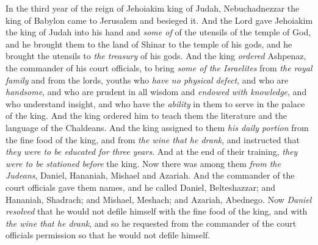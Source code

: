 
\begin{biblechapter} %
 In the third year of the reign of Jehoiakim king of Judah, Nebuchadnezzar the king of Babylon came to Jerusalem and besieged it.
\verse And the Lord gave Jehoiakim the king of Judah into his hand and \textit{some of} of the utensils of the temple of God, and he brought them to the land of Shinar to the temple of his gods, and he brought the utensils to \textit{the treasury} of his gods.
\verse And the king \textit{ordered} Ashpenaz, the commander of his court officials, to bring \textit{some of the Israelites} from \textit{the royal family} and from the lords,
\verse youths who \textit{have no physical defect}, and who are \textit{handsome}, and who are prudent in all wisdom and \textit{endowed with knowledge}, and who understand insight, and who have the \textit{ability} in them to serve in the palace of the king. And the king ordered him to teach them the literature and the language of the Chaldeans.
\verse And the king assigned to them \textit{his daily portion} from the fine food of the king, and from \textit{the wine that he drank}, and instructed that \textit{they were to be educated for three years}. And at the end of their training, \textit{they were to be stationed} \textit{before} the king.
\verse Now there was among them \textit{from the Judeans}, Daniel, Hananiah, Mishael and Azariah.
\verse And the commander of the court officials gave them names, and he called Daniel, Belteshazzar; and Hananiah, Shadrach; and Mishael, Meshach; and Azariah, Abednego.
 Now \textit{Daniel resolved} that he would not defile himself with the fine food of the king, and with \textit{the wine that he drank}, and so he requested from the commander of the court officials permission so that he would not defile himself.

\end{biblechapter}
